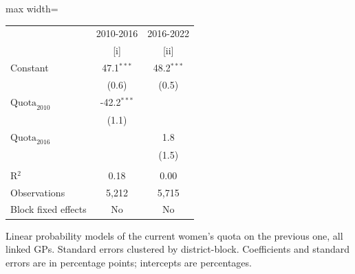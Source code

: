
\begingroup
\centering
\scriptsize
\begin{adjustbox}{max width=\linewidth}
   \begin{threeparttable}[b]
      \begin{tabular}{lcc}
         \toprule
                                & 2010-2016     & 2016-2022 \\
                                & [i]           & [ii]\\
         \midrule
         Constant               & 47.1$^{***}$  & 48.2$^{***}$\\
                                & (0.6)         & (0.5)\\
         $\text{Quota}_{2010}$  & -42.2$^{***}$ &   \\
                                & (1.1)         &   \\
         $\text{Quota}_{2016}$  &               & 1.8\\
                                &               & (1.5)\\
          \\
         R$^2$                  & 0.18          & 0.00\\
         Observations           & 5,212         & 5,715\\
         Block fixed effects    & No            & No\\
         \bottomrule
      \end{tabular}

      \begin{tablenotes}
         \item Linear probability models of the current women's quota on the previous one, all linked GPs. Standard errors clustered by district-block. Coefficients and standard errors are in percentage points; intercepts are percentages.
      \end{tablenotes}
   \end{threeparttable}
\end{adjustbox}
\par\endgroup


